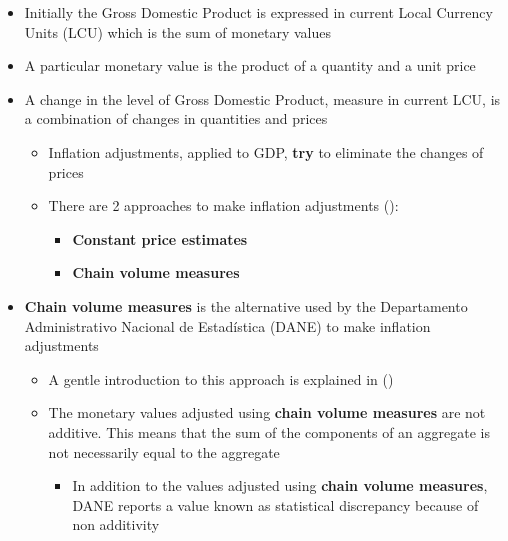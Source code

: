 \documentclass[
  ignorenonframetext,
]{beamer}
\providecommand{\tightlist}{%
  \setlength{\itemsep}{0pt}\setlength{\parskip}{0pt}}\usepackage{longtable,booktabs,array}
\begin{document}
\begin{frame}{}
\label{section-2}
\begin{itemize}
\item
  Initially the Gross Domestic Product is expressed in current Local
  Currency Units (LCU) which is the sum of monetary values
\item
  A particular monetary value is the product of a quantity and a unit
  price
\item
  A change in the level of Gross Domestic Product, measure in current
  LCU, is a combination of changes in quantities and prices

  \begin{itemize}
  \item
    Inflation adjustments, applied to GDP, \textbf{try} to eliminate the
    changes of prices
  \item
    There are 2 approaches to make inflation adjustments
    ():

    \begin{itemize}
    \tightlist
    \item
      \textbf{Constant price estimates}
    \item
      \textbf{Chain volume measures}
    \end{itemize}
  \end{itemize}
\end{itemize}
\end{frame}

\begin{frame}{}
\label{section-3}
\begin{itemize}
\item
  \textbf{Chain volume measures} is the alternative used by the
  Departamento Administrativo Nacional de Estadística (DANE) to make
  inflation adjustments

  \begin{itemize}
  \item
    A gentle introduction to this approach is explained in
    ()
  \item
    The monetary values adjusted using \textbf{chain volume measures}
    are not additive. This means that the sum of the components of an
    aggregate is not necessarily equal to the aggregate

    \begin{itemize}
    \tightlist
    \item
      In addition to the values adjusted using \textbf{chain volume
      measures}, DANE reports a value known as statistical discrepancy
      because of non additivity
    \end{itemize}
  \end{itemize}
\end{itemize}
\end{frame}
\end{document}
